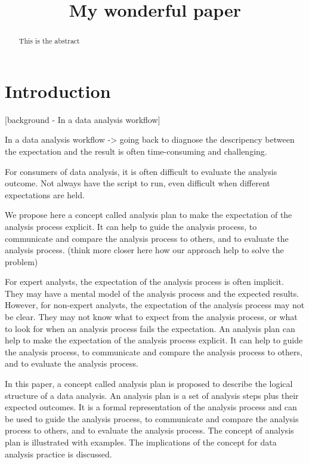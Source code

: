 \documentclass[
]{jds}
\title{My wonderful paper}
\author{}
\date{}
\begin{document}
\maketitle
\begin{abstract}
This is the abstract
\end{abstract}


\section{Introduction}\label{introduction}

{[}background - In a data analysis workflow{]}

In a data analysis workflow -\textgreater{} going back to diagnose the
descripency between the expectation and the result is often
time-consuming and challenging.

For consumers of data analysis, it is often difficult to evaluate the
analysis outcome. Not always have the script to run, even difficult when
different expectations are held.

We propose here a concept called analysis plan to make the expectation
of the analysis process explicit. It can help to guide the analysis
process, to communicate and compare the analysis process to others, and
to evaluate the analysis process. (think more closer here how our
approach help to solve the problem)

For expert analysts, the expectation of the analysis process is often
implicit. They may have a mental model of the analysis process and the
expected results. However, for non-expert analysts, the expectation of
the analysis process may not be clear. They may not know what to expect
from the analysis process, or what to look for when an analysis process
fails the expectation. An analysis plan can help to make the expectation
of the analysis process explicit. It can help to guide the analysis
process, to communicate and compare the analysis process to others, and
to evaluate the analysis process.

In this paper, a concept called analysis plan is proposed to describe
the logical structure of a data analysis. An analysis plan is a set of
analysis steps plus their expected outcomes. It is a formal
representation of the analysis process and can be used to guide the
analysis process, to communicate and compare the analysis process to
others, and to evaluate the analysis process. The concept of analysis
plan is illustrated with examples. The implications of the concept for
data analysis practice is discussed.
\end{document}
